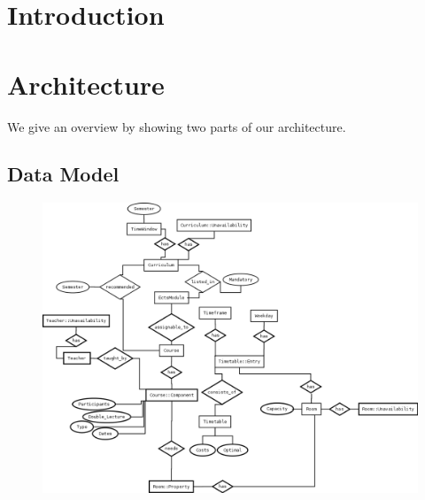 \documentclass[12pt]{article} %
\begin{document}

\tableofcontents %

\newpage %


\section{Introduction} 



\section{Architecture} %

We give an overview by showing two parts of our architecture.

\subsection{Data Model} 

\begin{figure}[h]
    \includegraphics[width=\textwidth]{TimetablingER_Dia.png}
    \label{fig:schema}
\end{figure}
\end{document}

